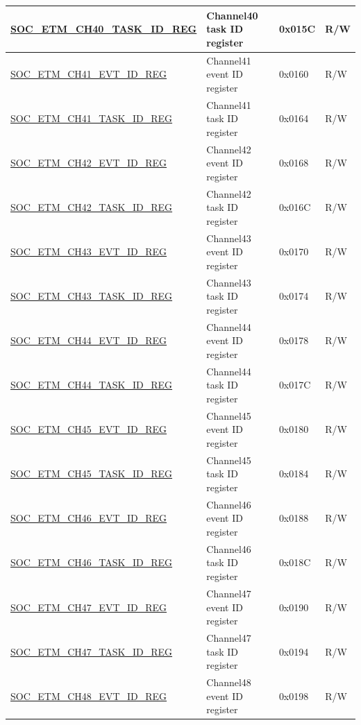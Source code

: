 \begin{longtable}{ | p{6cm} | p{6.2cm} | p{1.3cm} | p{2cm} | }
\hyperref[regdesc:SOCETMCHNTASKIDREG]{SOC\_ETM\_CH40\_TASK\_ID\_REG} & Channel40 task ID register & 0x015C & R/W \\ \hline
\hyperref[regdesc:SOCETMCHNEVTIDREG]{SOC\_ETM\_CH41\_EVT\_ID\_REG} & Channel41 event ID register & 0x0160 & R/W \\ \hline
\hyperref[regdesc:SOCETMCHNTASKIDREG]{SOC\_ETM\_CH41\_TASK\_ID\_REG} & Channel41 task ID register & 0x0164 & R/W \\ \hline
\hyperref[regdesc:SOCETMCHNEVTIDREG]{SOC\_ETM\_CH42\_EVT\_ID\_REG} & Channel42 event ID register & 0x0168 & R/W \\ \hline
\hyperref[regdesc:SOCETMCHNTASKIDREG]{SOC\_ETM\_CH42\_TASK\_ID\_REG} & Channel42 task ID register & 0x016C & R/W \\ \hline
\hyperref[regdesc:SOCETMCHNEVTIDREG]{SOC\_ETM\_CH43\_EVT\_ID\_REG} & Channel43 event ID register & 0x0170 & R/W \\ \hline
\hyperref[regdesc:SOCETMCHNTASKIDREG]{SOC\_ETM\_CH43\_TASK\_ID\_REG} & Channel43 task ID register & 0x0174 & R/W \\ \hline
\hyperref[regdesc:SOCETMCHNEVTIDREG]{SOC\_ETM\_CH44\_EVT\_ID\_REG} & Channel44 event ID register & 0x0178 & R/W \\ \hline
\hyperref[regdesc:SOCETMCHNTASKIDREG]{SOC\_ETM\_CH44\_TASK\_ID\_REG} & Channel44 task ID register & 0x017C & R/W \\ \hline
\hyperref[regdesc:SOCETMCHNEVTIDREG]{SOC\_ETM\_CH45\_EVT\_ID\_REG} & Channel45 event ID register & 0x0180 & R/W \\ \hline
\hyperref[regdesc:SOCETMCHNTASKIDREG]{SOC\_ETM\_CH45\_TASK\_ID\_REG} & Channel45 task ID register & 0x0184 & R/W \\ \hline
\hyperref[regdesc:SOCETMCHNEVTIDREG]{SOC\_ETM\_CH46\_EVT\_ID\_REG} & Channel46 event ID register & 0x0188 & R/W \\ \hline
\hyperref[regdesc:SOCETMCHNTASKIDREG]{SOC\_ETM\_CH46\_TASK\_ID\_REG} & Channel46 task ID register & 0x018C & R/W \\ \hline
\hyperref[regdesc:SOCETMCHNEVTIDREG]{SOC\_ETM\_CH47\_EVT\_ID\_REG} & Channel47 event ID register & 0x0190 & R/W \\ \hline
\hyperref[regdesc:SOCETMCHNTASKIDREG]{SOC\_ETM\_CH47\_TASK\_ID\_REG} & Channel47 task ID register & 0x0194 & R/W \\ \hline
\hyperref[regdesc:SOCETMCHNEVTIDREG]{SOC\_ETM\_CH48\_EVT\_ID\_REG} & Channel48 event ID register & 0x0198 & R/W \\ \hline

\end{longtable}
